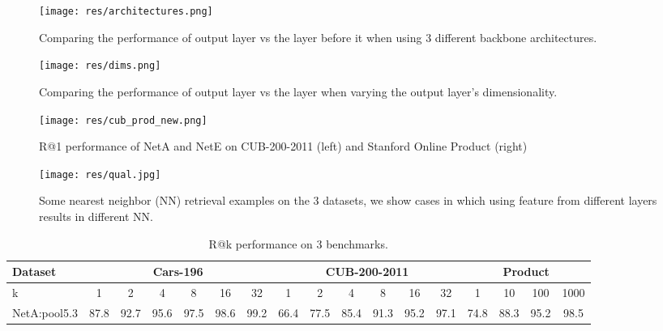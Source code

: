 \documentclass[10pt,twocolumn,letterpaper]{article}
\begin{document}
\begin{figure}
  \texttt{[image: res/architectures.png]}
  \vspace{2pt}
  \caption{Comparing the performance of output layer vs the layer before it when using 3 different backbone architectures.}
  \label{fig:architectures}
\end{figure}


\begin{figure}
  \texttt{[image: res/dims.png]}
  \vspace{2pt}
  \caption{Comparing the performance of output layer vs the layer when varying the output layer's dimensionality.}
  \label{fig:dims}
\end{figure}



\begin{figure*}[h]
\texttt{[image: res/cub\_prod\_new.png]}
\caption{R@1 performance of NetA and NetE on CUB-200-2011 (left) and Stanford Online Product (right)}
\label{fig:cub}
\end{figure*}



\begin{figure*}
\begin{center}
  \texttt{[image: res/qual.jpg]}
  \caption{Some nearest neighbor (NN) retrieval examples on the 3 datasets, we show cases in which using feature from different layers results in different NN.}
  \label{fig:qual}
\end{center}
\end{figure*}


\setlength{\tabcolsep}{5.1pt}
\begin{center}
\begin{table*}[]
\begin{center}
\centering
\label{table:benchmarks0}
\caption{R@k performance on 3 benchmarks.}
\begin{tabular}{| l || cccccc || c ccccc || c ccc |}
\hline
Dataset  & \multicolumn{6}{c||}{Cars-196} 
       & \multicolumn{6}{c||}{CUB-200-2011} 
       & \multicolumn{4}{c|}{Product} 
       \\
\hline

k  &    1 & 2 & 4 & 8 & 16 & 32
        &  1 & 2 & 4 & 8 & 16 & 32
        &  1 & 10 & 100 & 1000
       \\
       
\hline
\hline


NetA:pool5.3  &  87.8 & 92.7 & 95.6 & 97.5 & 98.6 & 99.2
          &  66.4 & 77.5 & 85.4 & 91.3 & 95.2 & 97.1
          &  74.8 & 88.3 & 95.2 & 98.5 \\

\hline

\end{tabular}
\label{table:benchmarks0}
\end{center}
\end{table*}
\end{center}
\end{document}
